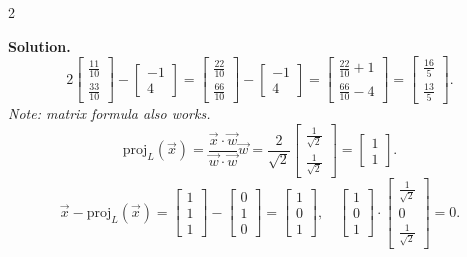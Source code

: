 \documentclass[8pt]{extarticle}
\begin{document}
\begin{multicols}{2}
\begin{tcolorbox}[title=]
\textbf{Solution.}
\[
2\begin{bmatrix}\frac{11}{10}\\[2pt]\frac{33}{10}\end{bmatrix}
-
\begin{bmatrix}-1\\[2pt]4\end{bmatrix}
=
\begin{bmatrix}\frac{22}{10}\\[2pt]\frac{66}{10}\end{bmatrix}
-
\begin{bmatrix}-1\\[2pt]4\end{bmatrix}
=
\begin{bmatrix}\frac{22}{10}+1\\[2pt]\frac{66}{10}-4\end{bmatrix}
=
\begin{bmatrix}\frac{16}{5}\\[2pt]\frac{13}{5}\end{bmatrix}.
\]
\textit{Note: matrix formula also works.}
\[
\mathrm{proj}_{L}(\vec{x})
=\frac{\vec{x}\cdot\vec{w}}{\vec{w}\cdot\vec{w}}\vec{w}
= \frac{2}{\sqrt{2}}
\begin{bmatrix}\frac{1}{\sqrt{2}}\\[2pt]\frac{1}{\sqrt{2}}\end{bmatrix}
= \begin{bmatrix}1\\1\end{bmatrix}.
\]
\[
\vec{x}-\mathrm{proj}_{L}(\vec{x})
=\begin{bmatrix}1\\1\\1\end{bmatrix}
-\begin{bmatrix}0\\1\\0\end{bmatrix}
=\begin{bmatrix}1\\0\\1\end{bmatrix},
\quad
\begin{bmatrix}1\\0\\1\end{bmatrix}\!\cdot\!
\begin{bmatrix}\tfrac1{\sqrt{2}}\\[2pt]0\\[2pt]\tfrac1{\sqrt{2}}\end{bmatrix}=0.
\]
\end{tcolorbox}


\end{multicols}
\end{document}
